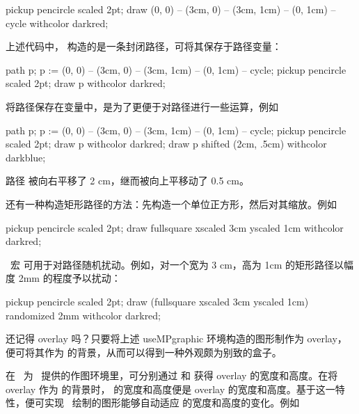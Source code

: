 \startexample
\startMPcode
pickup pencircle scaled 2pt;
draw (0, 0) -- (3cm, 0) -- (3cm, 1cm)
     -- (0, 1cm) -- cycle withcolor darkred;
\stopMPcode
\stopexample
\simpleexample[option=MP]{\getexample}

\noindent 上述代码中， 构造的是一条封闭路径，可将其保存于路径变量：

\starttyping[option=MP]
path p;
p := (0, 0) -- (3cm, 0) -- (3cm, 1cm) -- (0, 1cm) -- cycle;
pickup pencircle scaled 2pt;
draw p withcolor darkred;
\stoptyping

\noindent 将路径保存在变量中，是为了更便于对路径进行一些运算，例如

\startexample
\startMPcode
path p;
p := (0, 0) -- (3cm, 0)
      -- (3cm, 1cm) -- (0, 1cm) -- cycle;
pickup pencircle scaled 2pt;
draw p withcolor darkred;
draw p shifted (2cm, .5cm) withcolor darkblue;
\stopMPcode
\stopexample
\simpleexample[option=MP]{\getexample}

\noindent 路径  被向右平移了 2 cm，继而被向上平移动了 0.5 cm。

还有一种构造矩形路径的方法：先构造一个单位正方形，然后对其缩放。例如

\startexample
\startMPcode
pickup pencircle scaled 2pt;
draw fullsquare xscaled 3cm yscaled 1cm
                withcolor darkred;
\stopMPcode
\stopexample
\simpleexample[option=MP]{\getexample}

\MetaFun\ 宏  可用于对路径随机扰动。例如，对一个宽为 3 cm，高为 1cm 的矩形路径以幅度 2mm 的程度予以扰动：

\startexample
{}
pickup pencircle scaled 2pt;
draw (fullsquare xscaled 3cm yscaled 1cm)
                 randomized 2mm withcolor darkred;
\stopuseMPgraphic
{}
\stopexample
\simpleexample[option=MP]{\getexample}

还记得 overlay 吗？只要将上述 useMPgraphic 环境构造的图形制作为 overlay，便可将其作为 \type{\framed} 的背景，从而可以得到一种外观颇为别致的盒子。

\startexample
{}
\stopexample
\simpleexample[option=TEX]{\getexample}

在 \CONTEXT\ 为 \METAPOST\ 提供的作图环境里，可分别通过 \type{\overlaywidth} 和 \type{\overlayheight} 获得 overlay 的宽度和高度。在将 overlay 作为 \type{\framed} 的背景时，\type{\framed} 的宽度和高度便是 overlay 的宽度和高度。基于这一特性，便可实现 \METAPOST\ 绘制的图形能够自动适应 \type{\framed} 的宽度和高度的变化。例如

